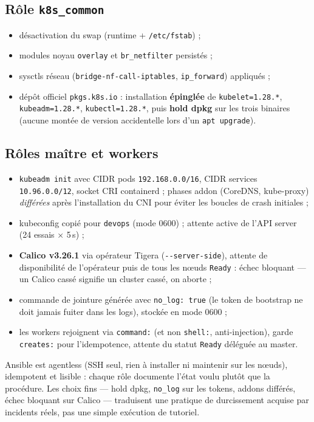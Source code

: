 \documentclass[11pt,a4paper]{article}
\begin{document}
\subsection{Rôle \texttt{k8s\_common}}
\begin{itemize}[itemsep=1pt]
  \item désactivation du swap (runtime + \texttt{/etc/fstab}) ;
  \item modules noyau \texttt{overlay} et \texttt{br\_netfilter} persistés ;
  \item sysctls réseau (\texttt{bridge-nf-call-iptables}, \texttt{ip\_forward}) appliqués ;
  \item dépôt officiel \texttt{pkgs.k8s.io} : installation \textbf{épinglée} de \texttt{kubelet=1.28.*}, \texttt{kubeadm=1.28.*}, \texttt{kubectl=1.28.*}, puis \textbf{hold dpkg} sur les trois binaires (aucune montée de version accidentelle lors d'un \texttt{apt upgrade}).
\end{itemize}

\subsection{Rôles maître et workers}
\begin{itemize}[itemsep=1pt]
  \item \texttt{kubeadm init} avec CIDR pods \texttt{192.168.0.0/16}, CIDR services \texttt{10.96.0.0/12}, socket CRI containerd ; phases addon (CoreDNS, kube-proxy) \emph{différées} après l'installation du CNI pour éviter les boucles de crash initiales ;
  \item kubeconfig copié pour \texttt{devops} (mode 0600) ; attente active de l'API server (24 essais × 5\,s) ;
  \item \textbf{Calico v3.26.1} via opérateur Tigera (\texttt{-{}-server-side}), attente de disponibilité de l'opérateur puis de tous les nœuds \texttt{Ready} : échec bloquant --- un Calico cassé signifie un cluster cassé, on aborte ;
  \item commande de jointure générée avec \texttt{no\_log: true} (le token de bootstrap ne doit jamais fuiter dans les logs), stockée en mode 0600 ;
  \item les workers rejoignent via \texttt{command:} (et non \texttt{shell:}, anti-injection), garde \texttt{creates:} pour l'idempotence, attente du statut \texttt{Ready} déléguée au master.
\end{itemize}

\begin{whybox}
Ansible est agentless (SSH seul, rien à installer ni maintenir sur les nœuds), idempotent et lisible : chaque rôle documente l'état voulu plutôt que la procédure. Les choix fins --- hold dpkg, \texttt{no\_log} sur les tokens, addons différés, échec bloquant sur Calico --- traduisent une pratique de durcissement acquise par incidents réels, pas une simple exécution de tutoriel.
\end{whybox}
\end{document}

